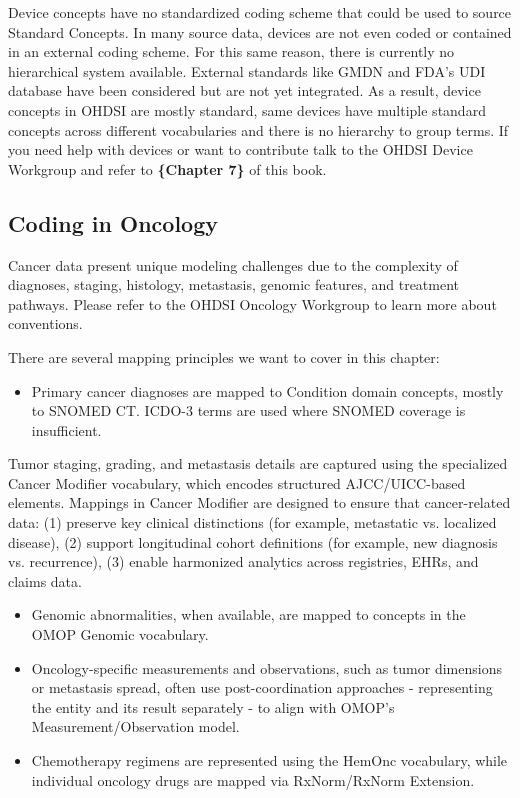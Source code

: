 \documentclass[
  letterpaper,
  paper=7in:10in,
  pagesize=pdftex,
  headinclude=on,
  footinclude=on,
  12pt]{scrbook}
\providecommand{\tightlist}{%
  \setlength{\itemsep}{0pt}\setlength{\parskip}{0pt}}\usepackage{longtable,booktabs,array}
\begin{document}
Device concepts have no standardized coding scheme that could be used to
source Standard Concepts. In many source data, devices are not even
coded or contained in an external coding scheme. For this same reason,
there is currently no hierarchical system available. External standards
like GMDN and FDA's UDI database have been considered but are not yet
integrated. As a result, device concepts in OHDSI are mostly standard,
same devices have multiple standard concepts across different
vocabularies and there is no hierarchy to group terms. If you need help
with devices or want to contribute talk to the OHDSI Device Workgroup
and refer to \textbf{\{Chapter 7\}} of this book.

\subsection{Coding in Oncology}\label{coding-in-oncology}

Cancer data present unique modeling challenges due to the complexity of
diagnoses, staging, histology, metastasis, genomic features, and
treatment pathways. Please refer to the OHDSI Oncology Workgroup to
learn more about conventions.

There are several mapping principles we want to cover in this chapter:

\begin{itemize}
\tightlist
\item
  Primary cancer diagnoses are mapped to Condition domain concepts,
  mostly to SNOMED CT. ICDO-3 terms are used where SNOMED coverage is
  insufficient.
\end{itemize}

Tumor staging, grading, and metastasis details are captured using the
specialized Cancer Modifier vocabulary, which encodes structured
AJCC/UICC-based elements. Mappings in Cancer Modifier are designed to
ensure that cancer-related data: (1) preserve key clinical distinctions
(for example, metastatic vs. localized disease), (2) support
longitudinal cohort definitions (for example, new diagnosis vs.
recurrence), (3) enable harmonized analytics across registries, EHRs,
and claims data.

\begin{itemize}
\item
  Genomic abnormalities, when available, are mapped to concepts in the
  OMOP Genomic vocabulary.
\item
  Oncology-specific measurements and observations, such as tumor
  dimensions or metastasis spread, often use post-coordination
  approaches - representing the entity and its result separately - to
  align with OMOP's Measurement/Observation model.
\item
  Chemotherapy regimens are represented using the HemOnc vocabulary,
  while individual oncology drugs are mapped via RxNorm/RxNorm
  Extension.
\end{itemize}
\end{document}
